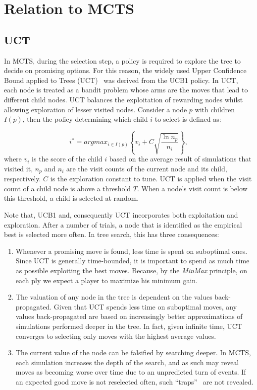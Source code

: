 \documentclass{kecsmstr}
\begin{document}
\newpage

\section{Relation to MCTS}
\label{sec:mabmcts}
\subsection{UCT}
In MCTS, during the selection step, a policy is required to explore the tree to decide on promising options. For this reason, the widely used Upper Confidence Bound applied to Trees (UCT)~ was derived from the UCB1 policy. In UCT, each node is treated as a bandit problem whose arms are the moves that lead to different child nodes. UCT balances the exploitation of rewarding nodes whilst allowing exploration of lesser visited nodes. Consider a node $p$ with children $I(p)$, then the policy determining which child $i$ to select is defined as:

\begin{equation}
\label{eq:uct}
i^* = argmax_{i \in I(p)}\left\{ v_i + C \sqrt{ \frac{\ln{n_p}}{n_i}}\right\},
\end{equation}
where $v_i$ is the score of the child $i$ based on the average result of simulations that visited it, $n_p$ and $n_i$ are the visit counts of the current node and its child, respectively. $C$ is the exploration constant to tune. UCT is applied when the visit count of a child node is above a threshold $T$. When a node's visit count is below this threshold, a child is selected at random.

Note that, UCB1 and, consequently UCT incorporates both exploitation and exploration. After a number of trials, a node that is identified as the empirical best is selected more often. In tree search, this has three consequences:
\begin{enumerate} 

\item Whenever a promising move is found, less time is spent on suboptimal ones. Since UCT is generally time-bounded, it is important to spend as much time as possible exploiting the best moves. Because, by the \emph{MinMax} principle, on each ply we expect a player to maximize his minimum gain. 

\item The valuation of any node in the tree is dependent on the values back-propagated. Given that UCT spends less time on suboptimal moves, any values back-propagated are based on increasingly better approximations of simulations performed deeper in the tree. In fact, given infinite time, UCT converges to selecting only moves with the highest average values.

\item The current value of the node can be falsified by searching deeper. In MCTS, each simulation increases the depth of the search, and as such may reveal moves as becoming worse over time due to an unpredicted turn of events. If an expected good move is not reselected often, such ``traps''~ are not revealed.

\end{enumerate}
\end{document}
